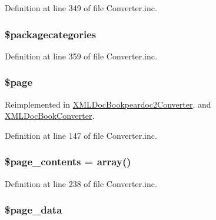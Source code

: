 \-Definition at line 349 of file \-Converter.\-inc.

\hypertarget{class_converter_ad46f1d4e924726751a32d205f64ccd80}{
\subsubsection[{\$packagecategories}]{\setlength{\rightskip}{0pt plus 5cm}\$packagecategories}}\label{class_converter_ad46f1d4e924726751a32d205f64ccd80}


\-Definition at line 359 of file \-Converter.\-inc.

\hypertarget{class_converter_a0a44e6760141442bb439b1ab1395d8ff}{
\subsubsection[{\$page}]{\setlength{\rightskip}{0pt plus 5cm}\$page}}\label{class_converter_a0a44e6760141442bb439b1ab1395d8ff}


\-Reimplemented in \hyperlink{class_x_m_l_doc_bookpeardoc2_converter_a0a44e6760141442bb439b1ab1395d8ff}{\-X\-M\-L\-Doc\-Bookpeardoc2\-Converter}, and \hyperlink{class_x_m_l_doc_book_converter_a0a44e6760141442bb439b1ab1395d8ff}{\-X\-M\-L\-Doc\-Book\-Converter}.



\-Definition at line 147 of file \-Converter.\-inc.

\hypertarget{class_converter_a52fe977b692aa0c2a45b5b372cc7ce14}{
\subsubsection[{\$page\-\_\-contents}]{\setlength{\rightskip}{0pt plus 5cm}\$page\-\_\-contents = array()}}\label{class_converter_a52fe977b692aa0c2a45b5b372cc7ce14}


\-Definition at line 238 of file \-Converter.\-inc.

\hypertarget{class_converter_a22fa57ada47299e1b00ca90f550a1194}{
\subsubsection[{\$page\-\_\-data}]{\setlength{\rightskip}{0pt plus 5cm}\$page\-\_\-data}}\label{class_converter_a22fa57ada47299e1b00ca90f550a1194}


